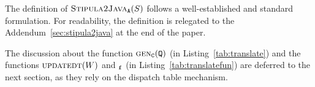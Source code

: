   The definition of $\mbox{\sc Stipula2Java}_{{\tt A}}(S)$ follows a well-established
  and standard formulation. For readability, the definition is
  relegated to the Addendum~\ref{sec:stipula2java} at the end of the paper.
%

The discussion about the
function $\mbox{\sc gen}_{\tt C}({\tt Q})$ (in
Listing~\ref{tab:translate}) and the functions $\mbox{\sc updatedt}(W)$ and
\ensureDT$_{\texttt{f}}$ (in Listing~\ref{tab:translatefun})
are deferred to the next section, as they
rely on the dispatch table mechanism.

